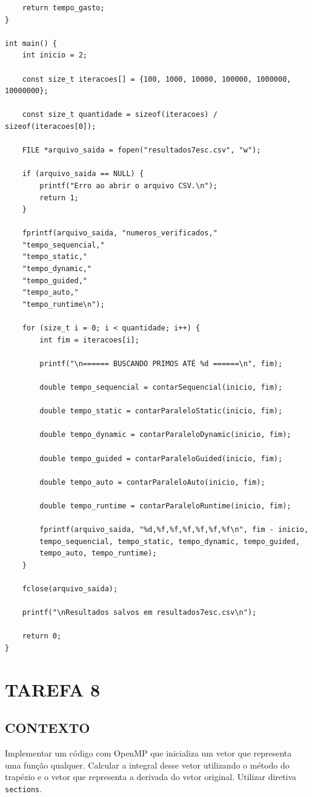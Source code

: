 \documentclass[12pt, openright, oneside, a4paper, brazil]{article}
\newcommand{\subtUm}{CONTEXTO}
\begin{document}
\begin{lstlisting}
	return tempo_gasto;
}

int main() {
	int inicio = 2;
	
	const size_t iteracoes[] = {100, 1000, 10000, 100000, 1000000, 10000000};
	
	const size_t quantidade = sizeof(iteracoes) / sizeof(iteracoes[0]);
	
	FILE *arquivo_saida = fopen("resultados7esc.csv", "w");
	
	if (arquivo_saida == NULL) {
		printf("Erro ao abrir o arquivo CSV.\n");
		return 1;
	}
	
	fprintf(arquivo_saida, "numeros_verificados,"
	"tempo_sequencial,"
	"tempo_static,"
	"tempo_dynamic,"
	"tempo_guided,"
	"tempo_auto,"
	"tempo_runtime\n");
	
	for (size_t i = 0; i < quantidade; i++) {
		int fim = iteracoes[i];
		
		printf("\n====== BUSCANDO PRIMOS ATÉ %d ======\n", fim);
		
		double tempo_sequencial = contarSequencial(inicio, fim);
		
		double tempo_static = contarParaleloStatic(inicio, fim);
		
		double tempo_dynamic = contarParaleloDynamic(inicio, fim);
		
		double tempo_guided = contarParaleloGuided(inicio, fim);
		
		double tempo_auto = contarParaleloAuto(inicio, fim);
		
		double tempo_runtime = contarParaleloRuntime(inicio, fim);
		
		fprintf(arquivo_saida, "%d,%f,%f,%f,%f,%f,%f\n", fim - inicio,
		tempo_sequencial, tempo_static, tempo_dynamic, tempo_guided,
		tempo_auto, tempo_runtime);
	}
	
	fclose(arquivo_saida);
	
	printf("\nResultados salvos em resultados7esc.csv\n");
	
	return 0;
}
		\end{lstlisting}

	\newpage
		\onehalfspacing
		\section{TAREFA 8}
		\subsection{\subtUm}
		\par{Implementar um código com OpenMP que inicializa um vetor que representa uma função qualquer. Calcular a integral desse vetor utilizando o método do trapézio e o vetor que representa a derivada do vetor original. Utilizar diretiva \texttt{sections}.}
\end{document}
